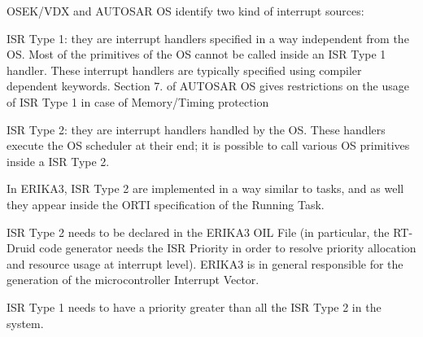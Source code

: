 O\+S\+E\+K/\+V\+DX and A\+U\+T\+O\+S\+AR OS identify two kind of interrupt sources\+:


\begin{DoxyItemize}
\item I\+SR Type 1\+: they are interrupt handlers specified in a way independent from the OS. Most of the primitives of the OS cannot be called inside an I\+SR Type 1 handler. These interrupt handlers are typically specified using compiler dependent keywords. Section 7. of A\+U\+T\+O\+S\+AR OS gives restrictions on the usage of I\+SR Type 1 in case of Memory/\+Timing protection
\item I\+SR Type 2\+: they are interrupt handlers handled by the OS. These handlers execute the OS scheduler at their end; it is possible to call various OS primitives inside a I\+SR Type 2.
\end{DoxyItemize}

In E\+R\+I\+K\+A3, I\+SR Type 2 are implemented in a way similar to tasks, and as well they appear inside the O\+R\+TI specification of the Running Task.

I\+SR Type 2 needs to be declared in the E\+R\+I\+K\+A3 O\+IL File (in particular, the R\+T-\/\+Druid code generator needs the I\+SR Priority in order to resolve priority allocation and resource usage at interrupt level). E\+R\+I\+K\+A3 is in general responsible for the generation of the microcontroller Interrupt Vector.

I\+SR Type 1 needs to have a priority greater than all the I\+SR Type 2 in the system. 